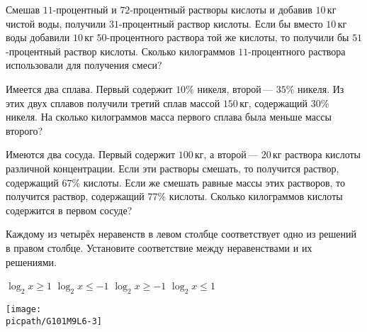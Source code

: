 \begin{homework}[number=4]
	\begin{listofex}
		\item Смешав \(11\)-процентный и \(72\)-процентный растворы кислоты и добавив \(10\) кг чистой воды, получили \(31\)-процентный раствор кислоты. Если бы вместо \(10\) кг воды добавили \(10\) кг \(50\)-процентного раствора той же кислоты, то получили бы \(51\)-процентный раствор кислоты. Сколько килограммов \(11\)-процентного раствора использовали для получения смеси?
		\item Имеется два сплава. Первый содержит \(10\%\) никеля, второй --- \(35\%\) никеля. Из этих двух сплавов получили третий сплав массой \(150\) кг, содержащий \(30\%\) никеля. На сколько килограммов масса первого сплава была меньше массы второго?
		\item Имеются два сосуда. Первый содержит \(100\) кг, а второй --- \(20\) кг раствора кислоты различной концентрации. Если эти растворы смешать, то получится раствор, содержащий \(67\%\) кислоты. Если же смешать равные массы этих растворов, то получится раствор, содержащий \(77\%\) кислоты. Сколько килограммов кислоты содержится в первом сосуде?
		\item Каждому из четырёх неравенств в левом столбце соответствует одно из решений в правом столбце. Установите соответствие между неравенствами и их решениями. \\
		\begin{minipage}[t]{\bodywidth}
			\begin{tasks}
				\task \( \log_2 x \ge 1 \)
				\task \( \log_2 x \le -1 \)
				\task \( \log_2 x \ge -1 \)
				\task \( \log_2 x \le 1 \)
			\end{tasks}
		\end{minipage}
		\hspace{0.02\linewidth}
		\begin{minipage}[t]{\picwidth}
			\texttt{[image: \\picpath/G101M9L6-3]}
		\end{minipage}
		

\end{listofex}
\end{homework}
